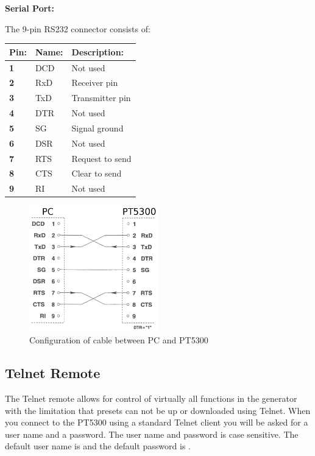 \textbf{Serial Port:}

The 9-pin RS232 connector consists of:\\
\begin{tabular}{|l|l|l|}
\hline
\textbf{Pin:} & \textbf{Name:} & \textbf{Description:} \\ \hline
\textbf{1}		& DCD & Not used\\ \hline
\textbf{2}		& RxD & Receiver pin\\ \hline
\textbf{3}		& TxD & Transmitter pin\\ \hline
\textbf{4}		& DTR & Not used\\ \hline
\textbf{5}		& SG & Signal ground\\ \hline
\textbf{6}		& DSR & Not used\\ \hline
\textbf{7}		& RTS & Request to send\\ \hline
\textbf{8}		& CTS & Clear to send\\ \hline
\textbf{9}		& RI & Not used\\ \hline
\end{tabular}


\begin{figure}[hbt]
\centering
\includegraphics[width=0.5\textwidth]{fig/RS232_connection}
\caption{Configuration of cable between PC and PT5300}
\end{figure}


\subsection{Telnet Remote}

The Telnet remote allows for control of virtually all functions in the generator with the limitation that presets can not be up or downloaded using Telnet.
When you connect to the PT5300 using a standard Telnet client you will be asked for a user name and a password. The user name and password is case sensitive. The default user name is \textbf{\DefaultUser} and the default password is \textbf{\DefaultPass}.

